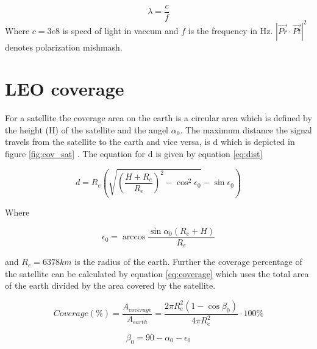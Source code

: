 \begin{equation}
\lambda = \frac{c}{f}
\end{equation}
Where $c = 3e8$ is speed of light in vaccum and $ f$ is the frequency in Hz. $|\vec{Pr}\cdot \vec{Pt}|^2$ denotes polarization mishmash. 

\section{LEO coverage}
For a satellite the coverage area on the earth is a circular area which is defined by the height (H) of the satellite and the angel $\alpha_0$. The maximum distance the signal travels from the satellite to the earth and vice versa, is d which is depicted in figure \ref{fig:cov_sat} \citep{Cakaj2014}. The equation for d is given by equation \ref{eq:dist} 

\begin{equation}\label{eq:dist}
d=R_e(\sqrt{(\frac{H+R_e}{R_e})^2-\cos^2{\epsilon_0}}-\sin{\epsilon_0})
\end{equation}


Where

\begin{equation}\label{eq:dist2}
\epsilon_0 = \arccos{\frac{\sin{\alpha_0}(R_e+H)}{R_e}}
\end{equation}


and $R_e = 6378km$ is the radius of the earth. Further the coverage percentage of the satellite can be calculated by equation \ref{eq:coverage} which uses the total area of the earth divided by the area covered by the satellite. 

\begin{equation}\label{eq:coverage}
Coverage(\%) = \frac{A_{coverage}}{A_{earth}} = \frac{2 \pi R_e^2 ( 1 - \cos{\beta_0})}{4 \pi R_e^2}\cdot 100\%
\end{equation}
 

\begin{equation}
\beta_0 = 90 - \alpha_0 -\epsilon_0
\end{equation}



